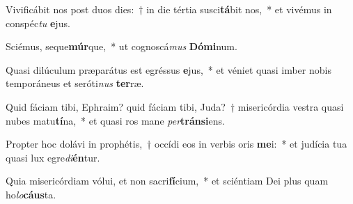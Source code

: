 \item Vivificábit nos post duos dies:~† in die tértia susci\textbf{tá}bit nos,~* et vivémus in conspéc\textit{tu} \textbf{e}jus.
\item Sciémus, seque\textbf{múr}que,~* ut cognoscá\textit{mus} \textbf{Dó}\textbf{mi}num.
\item Quasi dilúculum præparátus est egréssus \textbf{e}jus,~* et véniet quasi imber nobis temporáneus et seróti\textit{nus} \textbf{ter}ræ.
\item Quid fáciam tibi, Ephraim? quid fáciam tibi, Juda?~† misericórdia vestra quasi nubes matu\textbf{tí}na,~* et quasi ros mane \textit{per}\textbf{tráns}\textbf{i}ens.
\item Propter hoc dolávi in prophétis,~† occídi eos in verbis oris \textbf{me}i:~* et judícia tua quasi lux egre\textit{di}\textbf{én}tur.
\item Quia misericórdiam vólui, et non sacri\textbf{fí}cium,~* et sciéntiam Dei plus quam ho\textit{lo}\textbf{cáus}ta.
